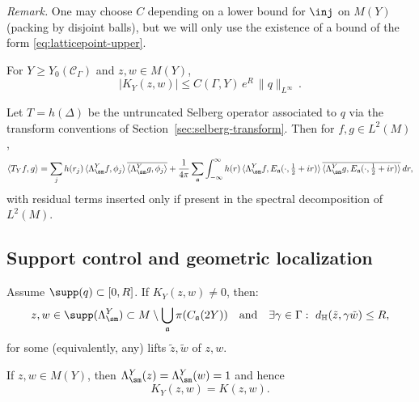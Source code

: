 \noindent
\emph{Remark.} One may choose $C$ depending on a lower bound for $\inj$ on $M(Y)$ (packing by disjoint balls),
but we will only use the existence of a bound of the form \eqref{eq:latticepoint-upper}.

\begin{corollary}\label{cor:KY-pointwise}
For $Y\ge Y_0(\mathscr C_\Gamma)$ and $z,w\in M(Y)$,
\begin{equation}\label{eq:KY-pointwise}
|K_Y(z,w)|\le C(\Gamma,Y)\,e^{R}\,\|q\|_{L^\infty}\,.
\end{equation}
\end{corollary}

\begin{proposition}\label{prop:KY-spectral-qf}
Let $T=h(\Delta)$ be the untruncated Selberg operator associated to $q$ via the transform conventions of
Section~\ref{sec:selberg-transform}. Then for $f,g\in L^2(M)$,
\begin{equation}\label{eq:KY-qf-spectral}
\langle T_Y f,g\rangle
=\sum_{j} h(r_j)\,\langle \Lambda^Y_{\sm}f,\phi_j\rangle\,\overline{\langle \Lambda^Y_{\sm}g,\phi_j\rangle}
+\frac{1}{4\pi}\sum_{\mathfrak a}\int_{-\infty}^{\infty}
h(r)\,
\langle \Lambda^Y_{\sm}f,E_{\mathfrak a}(\cdot,\tfrac12+ir)\rangle\,
\overline{\langle \Lambda^Y_{\sm}g,E_{\mathfrak a}(\cdot,\tfrac12+ir)\rangle}\,dr,
\end{equation}
with residual terms inserted only if present in the spectral decomposition of $L^2(M)$.
\end{proposition}

\subsection{Support control and geometric localization}\label{subsec:block3.3}

\begin{lemma}\label{lem:support-criterion}
Assume $\supp(q)\subset[0,R]$. If $K_Y(z,w)\neq 0$, then:
\[
z,w\in \supp(\Lambda^Y_{\sm})\subset M\setminus \bigcup_{\mathfrak a}\pi(C_{\mathfrak a}(2Y))
\quad\text{and}\quad
\exists\gamma\in\Gamma:\ d_\H(\tilde z,\gamma\tilde w)\le R,
\]
for some (equivalently, any) lifts $\tilde z,\tilde w$ of $z,w$.
\end{lemma}

\begin{corollary}\label{cor:core-stability}
If $z,w\in M(Y)$, then $\Lambda^Y_{\sm}(z)=\Lambda^Y_{\sm}(w)=1$ and hence
\[
K_Y(z,w)=K(z,w).
\]
\end{corollary}

